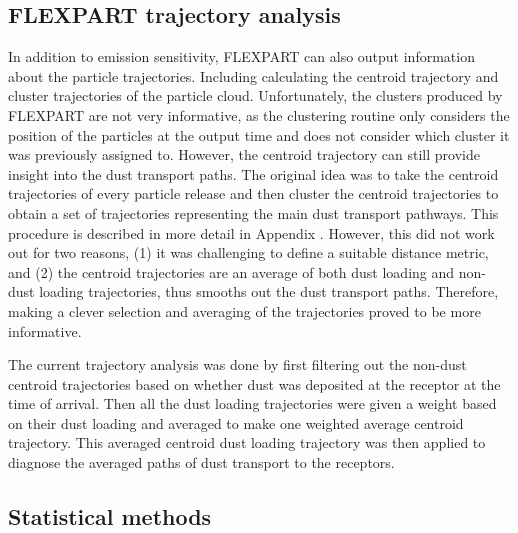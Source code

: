 \subsection{FLEXPART trajectory analysis}\label{chap:method_trajec_analysis}
In addition to emission sensitivity, FLEXPART can also output information about the particle trajectories. Including calculating the centroid trajectory and cluster trajectories of the particle cloud. 
Unfortunately, the clusters produced by FLEXPART are not very informative, as the clustering routine only considers the position of the particles at the output time and does not consider which cluster it was previously assigned to. However, the centroid trajectory can still provide insight into the dust transport paths. 
The original idea was to take the centroid trajectories of every particle release and then cluster the centroid trajectories to obtain a set of trajectories representing the main dust transport pathways. 
This procedure is described in more detail in Appendix . 
However, this did not work out for two reasons, (1) it was challenging to define a suitable distance metric, and (2) the centroid trajectories are an average of both dust loading and non-dust loading trajectories, thus smooths out the dust transport paths. 
Therefore, making a clever selection and averaging of the trajectories proved to be more informative. 

The current trajectory analysis was done by first filtering out the non-dust centroid trajectories based on whether dust was deposited at the receptor at the time of arrival. 
Then all the dust loading trajectories were given a weight based on their dust loading and averaged to make one weighted average centroid trajectory. 
This averaged centroid dust loading trajectory was then applied to diagnose the averaged paths of dust transport to the receptors.       
 

\subsection{Statistical methods}

